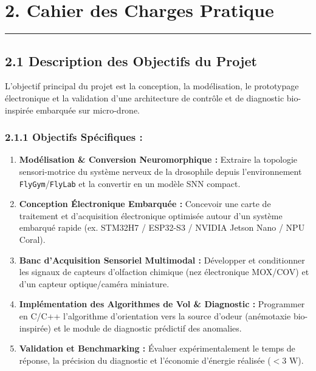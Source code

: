 \documentclass[11pt,a4paper]{article}
\begin{document}
\vspace{0.4cm}
\section*{\color{primaryblue}2. Cahier des Charges Pratique}
\hrule
\vspace{0.3cm}

\subsection*{\color{secondarygreen}2.1 Description des Objectifs du Projet}
L'objectif principal du projet est la conception, la modélisation, le prototypage électronique et la validation d'une architecture de contrôle et de diagnostic bio-inspirée embarquée sur micro-drone.

\subsubsection*{\color{darkgray}2.1.1 Objectifs Spécifiques :}
\begin{enumerate}
    \item \textbf{Modélisation \& Conversion Neuromorphique :} Extraire la topologie sensori-motrice du système nerveux de la drosophile depuis l'environnement \texttt{FlyGym}/\texttt{FlyLab} et la convertir en un modèle SNN compact.
    \item \textbf{Conception Électronique Embarquée :} Concevoir une carte de traitement et d'acquisition électronique optimisée autour d'un système embarqué rapide (ex. STM32H7 / ESP32-S3 / NVIDIA Jetson Nano / NPU Coral).
    \item \textbf{Banc d'Acquisition Sensoriel Multimodal :} Développer et conditionner les signaux de capteurs d'olfaction chimique (nez électronique MOX/COV) et d'un capteur optique/caméra miniature.
    \item \textbf{Implémentation des Algorithmes de Vol \& Diagnostic :} Programmer en C/C++ l'algorithme d'orientation vers la source d'odeur (anémotaxie bio-inspirée) et le module de diagnostic prédictif des anomalies.
    \item \textbf{Validation et Benchmarking :} Évaluer expérimentalement le temps de réponse, la précision du diagnostic et l'économie d'énergie réalisée ($< 3\text{ W}$).
\end{enumerate}
\end{document}
